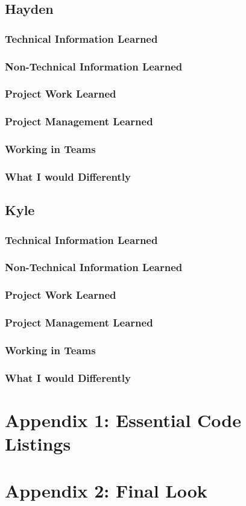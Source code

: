 \documentclass[draftclsnofoot, onecolumn, compsoc, 10pt]{IEEEtran}
\begin{document}
\subsection{Hayden}
\subsubsection{Technical Information Learned}
\subsubsection{Non-Technical Information Learned}
\subsubsection{Project Work Learned}
\subsubsection{Project Management Learned}
\subsubsection{Working in Teams}
\subsubsection{What I would Differently}
\subsection{Kyle}
\subsubsection{Technical Information Learned}
\subsubsection{Non-Technical Information Learned}
\subsubsection{Project Work Learned}
\subsubsection{Project Management Learned}
\subsubsection{Working in Teams}
\subsubsection{What I would Differently}
\section{Appendix 1: Essential Code Listings}
\section{Appendix 2: Final Look}
\end{document}
